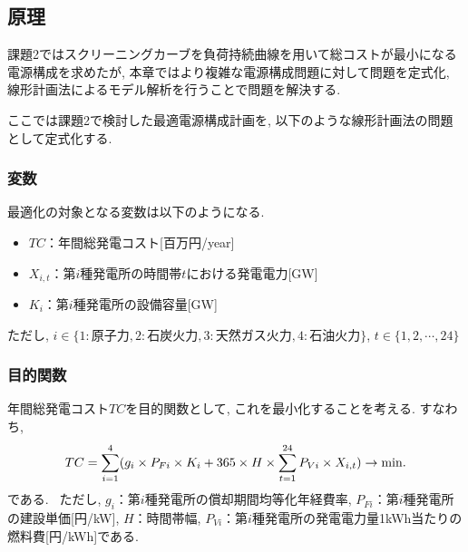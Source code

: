 \documentclass[]{jsarticle}
\begin{document}
  \subsection{原理\label{pri3}}
      課題2ではスクリーニングカーブを負荷持続曲線を用いて総コストが最小になる電源構成を求めたが, 本章ではより複雑な電源構成問題に対して問題を定式化, 線形計画法によるモデル解析を行うことで問題を解決する.

      ここでは課題2で検討した最適電源構成計画を, 以下のような線形計画法の問題として定式化する.

      \subsubsection{変数}
          最適化の対象となる変数は以下のようになる.
          \begin{itemize}
            \item $TC$：年間総発電コスト[百万円/year]
            \item $X_{i,t}$：第$i$種発電所の時間帯$t$における発電電力[GW]
            \item $K_i$：第$i$種発電所の設備容量[GW]
          \end{itemize}
          ただし, $i \in \{1:原子力, 2:石炭火力, 3:天然ガス火力, 4:石油火力\}$, $t \in \{1, 2, \cdots , 24\}$

      \subsubsection{目的関数}
          年間総発電コスト$TC$を目的関数として, これを最小化することを考える. すなわち,
          \begin{eqnarray}
              TC = \sum_{i=1}^4 (g_i \times P_{Fi} \times K_i + 365 \times H \times \sum_{t=1}^{24} P_{Vi} \times X_{i, t}) \to \rm{min}.
          \end{eqnarray}
          である. \
          ただし, $g_i$：第$i$種発電所の償却期間均等化年経費率, $P_{Fi}$：第$i$種発電所の建設単価[円/kW], $H$：時間帯幅, $P_{Vi}$：第$i$種発電所の発電電力量1kWh当たりの燃料費[円/kWh]である.
\end{document}
